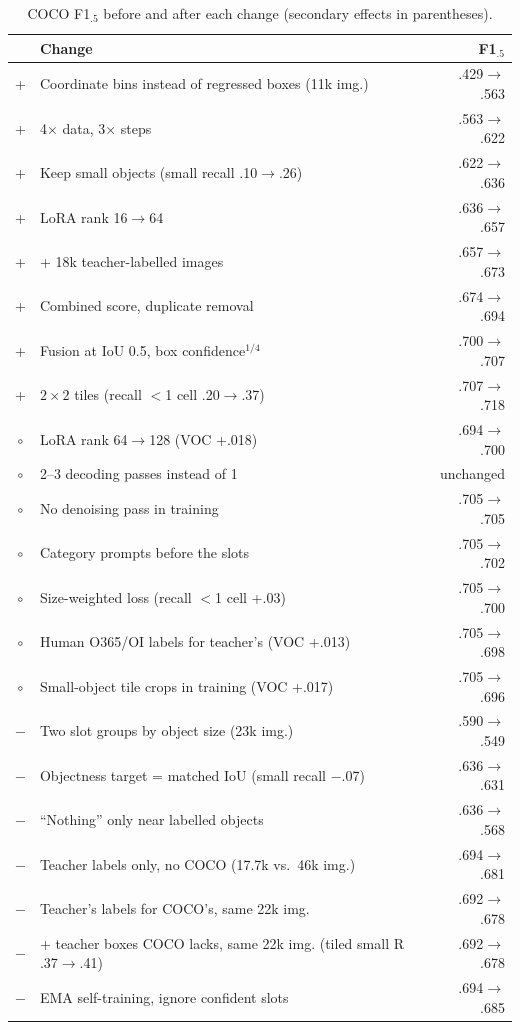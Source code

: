 \documentclass[10pt,twocolumn]{article}
\newcommand{\ok}{\textcolor{green!45!black}{+}}
\newcommand{\no}{\textcolor{red!70!black}{$-$}}
\newcommand{\eq}{$\circ$}
\begin{document}
\begin{table}[h]
\centering\small\setlength{\tabcolsep}{6pt}
\caption{COCO F1$_{.5}$ before and after each change (secondary effects in parentheses).}
\label{tab:ablate}
\begin{tabular}{@{}clr@{}}
\toprule
& Change & F1$_{.5}$ \\
\midrule
\ok & Coordinate bins instead of regressed boxes (11k img.) & .429$\rightarrow$.563 \\
\ok & 4$\times$ data, 3$\times$ steps & .563$\rightarrow$.622 \\
\ok & Keep small objects (small recall .10$\rightarrow$.26) & .622$\rightarrow$.636 \\
\ok & LoRA rank 16$\rightarrow$64 & .636$\rightarrow$.657 \\
\ok & + 18k teacher-labelled images & .657$\rightarrow$.673 \\
\ok & Combined score, duplicate removal & .674$\rightarrow$.694 \\
\ok & Fusion at IoU 0.5, box confidence$^{1/4}$ & .700$\rightarrow$.707 \\
\ok & $2\times2$ tiles (recall $<$1 cell .20$\rightarrow$.37) & .707$\rightarrow$.718 \\
\eq & LoRA rank 64$\rightarrow$128 (VOC +.018) & .694$\rightarrow$.700 \\
\eq & 2--3 decoding passes instead of 1 & unchanged \\
\eq & No denoising pass in training & .705$\rightarrow$.705 \\
\eq & Category prompts before the slots & .705$\rightarrow$.702 \\
\eq & Size-weighted loss (recall $<$1 cell +.03) & .705$\rightarrow$.700 \\
\eq & Human O365/OI labels for teacher's (VOC +.013) & .705$\rightarrow$.698 \\
\eq & Small-object tile crops in training (VOC +.017) & .705$\rightarrow$.696 \\
\no & Two slot groups by object size (23k img.) & .590$\rightarrow$.549 \\
\no & Objectness target = matched IoU (small recall $-$.07) & .636$\rightarrow$.631 \\
\no & ``Nothing'' only near labelled objects & .636$\rightarrow$.568 \\
\no & Teacher labels only, no COCO (17.7k vs.\ 46k img.) & .694$\rightarrow$.681 \\
\no & Teacher's labels for COCO's, same 22k img. & .692$\rightarrow$.678 \\
\no & + teacher boxes COCO lacks, same 22k img. (tiled small R .37$\rightarrow$.41) & .692$\rightarrow$.678 \\
\no & EMA self-training, ignore confident slots & .694$\rightarrow$.685 \\
\bottomrule
\end{tabular}
\end{table}
\end{document}
